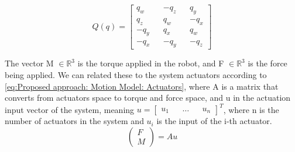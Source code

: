 \begin{equation}
    Q\left(q\right) = 
    \begin{bmatrix}
        q_w && -q_z && q_y \\
        q_z && q_w && -q_x \\
        -q_y && q_x && q_w \\
        -q_x && -q_y && -q_z
    \end{bmatrix}
    \label{eq:Proposed approach: Motion Model: Q matrix}
\end{equation}

The vector M $\in \mathbb{R}^{3}$ is the torque applied in the robot, and F $\in \mathbb{R}^3$ is the force being applied. We can related these to the system actuators according to \ref{eq:Proposed approach: Motion Model: Actuators}, where A is a matrix that converts from actuators space to torque and force space, and u in the actuation input vector of the system, meaning $u = \begin{bmatrix} u_{1} && \dots && u_{n} \end{bmatrix}^{T}$, where n is the number of actuators in the system and $u_{i}$ is the input of the i-th actuator. 
\begin{equation}
    \begin{pmatrix}
        F \\
        M
    \end{pmatrix} = A u
    \label{eq:Proposed approach: Motion Model: Actuators}
\end{equation}
